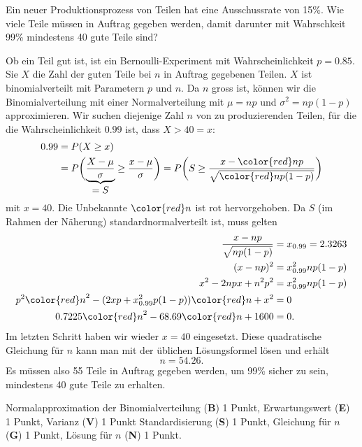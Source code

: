 Ein neuer Produktionsprozess von Teilen hat eine Ausschussrate von 15\%.
Wie viele Teile müssen in Auftrag gegeben werden, damit darunter
mit Wahrschkeit 99\% mindestens 40 gute Teile sind?


\begin{loesung}
Ob ein Teil gut ist, ist ein Bernoulli-Experiment mit Wahrscheinlichkeit
$p=0.85$.
Sie $X$ die Zahl der guten Teile bei $n$ in Auftrag gegebenen Teilen.
$X$ ist binomialverteilt mit Parametern $p$ und $n$.
Da $n$ gross ist, können wir die Binomialverteilung mit einer
Normalverteilung mit $\mu=np$ und $\sigma^2=np(1-p)$ approximieren.
Wir suchen diejenige Zahl $n$ von zu produzierenden Teilen, für
die die Wahrscheinlichkeit $0.99$ ist, dass $X>40 =x$:
\begin{align*}
0.99
&=
P(X\ge x)\\
&=
P\biggl(\underbrace{\frac{X-\mu}{\sigma}}_{\displaystyle=S}\ge \frac{x-\mu}{\sigma}\biggr)
=
P\biggl(S\ge \frac{x-{\color{red}n}p}{\sqrt{{\color{red}n}p(1-p)}}\biggr)
\end{align*}
mit $x=40$.
Die Unbekannte $\color{red}n$ ist rot hervorgehoben.
Da $S$ (im Rahmen der Näherung) standardnormalverteilt ist, muss
gelten
\begin{align*}
\frac{x-np}{\sqrt{np(1-p)}}
&=
x_{0.99}=2.3263
\\
(x-np)^2
&=
x_{0.99}^2np(1-p)
\\
x^2-2npx+n^2p^2
&=
x_{0.99}^2np(1-p)
\\
p^2{\color{red}n}^2
-
(2xp+x_{0.99}^2p(1-p)) {\color{red}n}
+
x^2
&=0
\\
0.7225 {\color{red}n}^2 -68.69 {\color{red}n} + 1600
&= 
0.
\end{align*}
Im letzten Schritt haben wir wieder $x=40$ eingesetzt.
Diese quadratische Gleichung für $n$ kann man mit der üblichen
Lösungsformel lösen und erhält
\[
n=54.26.
\]
Es müssen also 55 Teile in Auftrag gegeben werden, um 99\% sicher zu sein,
mindestens 40 gute Teile zu erhalten.
\end{loesung}

\begin{bewertung}
Normalapproximation der Binomialverteilung ({\bf B}) 1 Punkt,
Erwartungswert ({\bf E}) 1 Punkt,
Varianz ({\bf V}) 1 Punkt
Standardisierung ({\bf S}) 1 Punkt,
Gleichung für $n$ ({\bf G}) 1 Punkt,
Lösung für $n$ ({\bf N}) 1 Punkt.
\end{bewertung}
